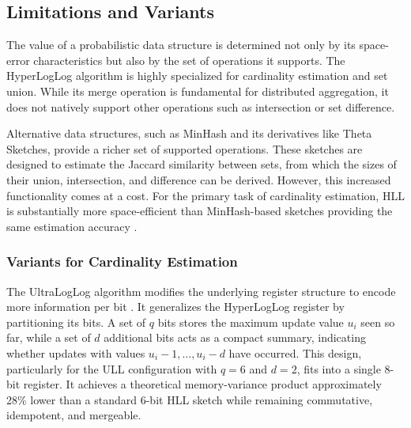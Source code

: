 \subsection{Limitations and Variants}


The value of a probabilistic data structure is determined not only by its space-error characteristics but also by the set of operations it supports. The HyperLogLog algorithm is highly specialized for cardinality estimation and set union. While its merge operation is fundamental for distributed aggregation, it does not natively support other operations such as intersection or set difference.

Alternative data structures, such as MinHash and its derivatives like Theta Sketches, provide a richer set of supported operations. These sketches are designed to estimate the Jaccard similarity between sets, from which the sizes of their union, intersection, and difference can be derived. However, this increased functionality comes at a cost. For the primary task of cardinality estimation, HLL is substantially more space-efficient than MinHash-based sketches providing the same estimation accuracy \cite{Ertl2021SetSketchFT}.


\subsubsection{Variants for Cardinality Estimation}


The UltraLogLog algorithm modifies the underlying register structure to encode more information per bit \cite{Ertl2023UltraLogLogAP}. It generalizes the HyperLogLog register by partitioning its bits. A set of $q$ bits stores the maximum update value $u_i$ seen so far, while a set of $d$ additional bits acts as a compact summary, indicating whether updates with values $u_i-1, \dots, u_i-d$ have occurred. This design, particularly for the ULL configuration with $q=6$ and $d=2$, fits into a single 8-bit register. It achieves a theoretical memory-variance product approximately 28\% lower than a standard 6-bit HLL sketch while remaining commutative, idempotent, and mergeable.

